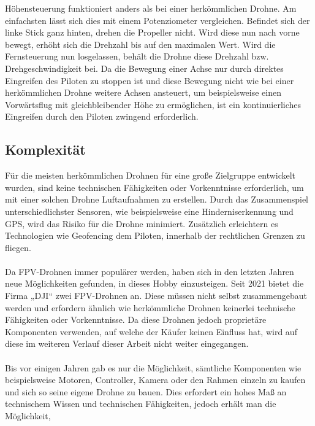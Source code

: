         Höhensteuerung funktioniert anders als bei einer herkömmlichen Drohne. Am einfachsten lässt sich dies mit
        einem Potenziometer vergleichen. Befindet sich der linke Stick ganz hinten, drehen die Propeller nicht.
        Wird diese nun nach vorne bewegt, erhöht sich die Drehzahl bis auf den maximalen Wert. Wird die Fernsteuerung
        nun losgelassen, behält die Drohne diese Drehzahl bzw. Drehgeschwindigkeit bei. Da die Bewegung einer Achse
        nur durch direktes Eingreifen des Piloten zu stoppen ist und diese Bewegung nicht wie bei einer herkömmlichen
        Drohne weitere Achsen ansteuert, um beispielsweise einen Vorwärtsflug mit gleichbleibender Höhe zu ermöglichen,
        ist ein kontinuierliches Eingreifen durch den Piloten zwingend erforderlich.

    \subsection[Komplexität]{Komplexität}
        Für die meisten herkömmlichen Drohnen für eine große Zielgruppe entwickelt wurden, sind keine technischen
        Fähigkeiten oder Vorkenntnisse erforderlich, um mit einer solchen Drohne Luftaufnahmen zu erstellen.\cite{shon2022}
        Durch das Zusammenspiel unterschiedlichster Sensoren, wie beispielsweise eine Hinderniserkennung und GPS,
        wird das Risiko für die Drohne minimiert. Zusätzlich erleichtern es Technologien wie Geofencing dem Piloten,
        innerhalb der rechtlichen Grenzen zu fliegen. \\
        \\
        Da FPV-Drohnen immer populärer werden, haben sich in den letzten Jahren neue Möglichkeiten gefunden, in
        dieses Hobby einzusteigen. Seit 2021 bietet die Firma „DJI“ zwei FPV-Drohnen an. Diese müssen nicht selbst
        zusammengebaut werden und erfordern ähnlich wie herkömmliche Drohnen keinerlei technische Fähigkeiten oder
        Vorkenntnisse.\cite{DJIAvatar}\cite{DJIFpv} Da diese Drohnen jedoch proprietäre Komponenten verwenden, auf welche der Käufer keinen Einfluss
        hat, wird auf diese im weiteren Verlauf dieser Arbeit nicht weiter eingegangen. \\
        \\
        Bis vor einigen Jahren gab es nur die Möglichkeit, sämtliche Komponenten wie beispielsweise Motoren,
        Controller, Kamera oder den Rahmen einzeln zu kaufen und sich so seine eigene Drohne zu bauen. Dies
        erfordert ein hohes Maß an technischem Wissen und technischen Fähigkeiten, jedoch erhält man die Möglichkeit,
